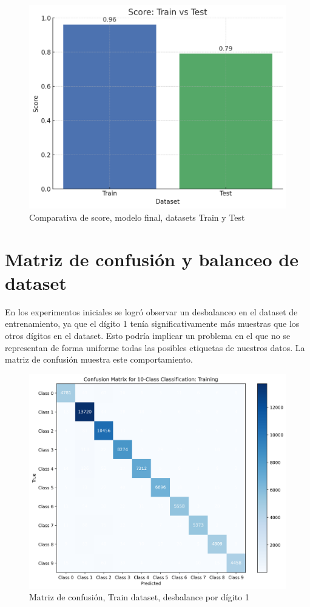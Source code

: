 \documentclass[journal]{IEEEtran}
\begin{document}
\begin{figure}[H]
        \centering
        \includegraphics[width=0.9\linewidth]{figures/train_vs_test_final.png}
        \caption{Comparativa de score, modelo final, datasets Train y Test}
        \label{fig:score_train_vs_test}
\end{figure}

\section{Matriz de confusión y balanceo de dataset}
En los experimentos iniciales se logró observar un desbalanceo en el dataset de entrenamiento, ya que el dígito 1 tenía significativamente más muestras que los otros dígitos en el dataset. Esto podría implicar un problema en el que no se representan de forma uniforme todas las posibles etiquetas de nuestros datos. La matriz de confusión muestra este comportamiento.

\begin{figure}[H]
        \centering
        \includegraphics[width=\linewidth]{figures/confusion_matrix_Training_preSMOTE.png}
        \caption{Matriz de confusión, Train dataset, desbalance por dígito 1}
        \label{fig:confusion_matrix_pre_smote}
\end{figure}
\end{document}
